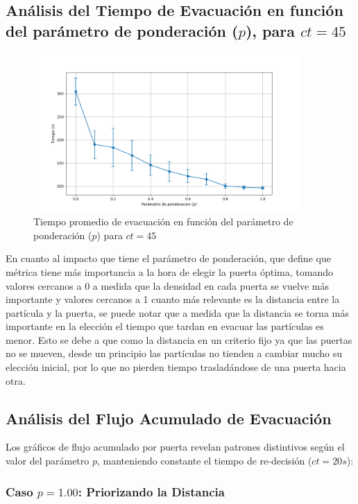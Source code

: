 \documentclass[12pt]{article}
\begin{document}
\subsection{Análisis del Tiempo de Evacuación en función del parámetro de ponderación ($p$), para $ct=45$}
\begin{figure}[H]
\centering
\includegraphics[width=0.9\textwidth]{img/evacuation_times_t_45.png}
\caption{Tiempo promedio de evacuación en función del parámetro de ponderación ($p$) para $ct=45$}
\label{fig:evac_time_ct}
\end{figure}
En cuanto al impacto que tiene el parámetro de ponderación, que define que métrica tiene más importancia a la hora de elegir la puerta óptima, tomando valores cercanos a 0 a medida que la densidad en cada puerta se vuelve más importante y valores cercanos a 1 cuanto más relevante es la distancia entre la partícula y la puerta, se puede notar que a medida que la distancia se torna más importante en la elección el tiempo que tardan en evacuar las partículas es menor. Esto se debe a que como la distancia en un criterio fijo ya que las puertas no se mueven, desde un principio las partículas no tienden a cambiar mucho su elección inicial, por lo que no pierden tiempo trasladándose de una puerta hacia otra.

\subsection{Análisis del Flujo Acumulado de Evacuación}
Los gráficos de flujo acumulado por puerta revelan patrones distintivos según el valor del parámetro $p$, manteniendo constante el tiempo de re-decisión ($ct=20s$):

\subsubsection{Caso $p=1.00$: Priorizando la Distancia}
\end{document}

